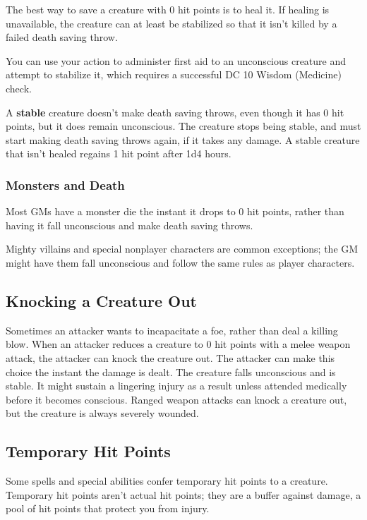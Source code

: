 The best way to save a creature with 0 hit points is to heal it. If healing is unavailable, the creature can at least be stabilized so that it isn't killed by a failed death saving throw.

You can use your action to administer first aid to an unconscious creature and attempt to stabilize it, which requires a successful DC 10 Wisdom (Medicine) check.

A \textbf{stable} creature doesn't make death saving throws, even though it has 0 hit points, but it does remain unconscious. The creature stops being stable, and must start making death saving throws again, if it takes any damage. A stable creature that isn't healed regains 1 hit point after 1d4 hours.

\subsubsection{Monsters and Death}

Most GMs have a monster die the instant it drops to 0 hit points, rather than having it fall unconscious and make death saving throws.

Mighty villains and special nonplayer characters are common exceptions; the GM might have them fall unconscious and follow the same rules as player characters.

\subsection{Knocking a Creature Out}

Sometimes an attacker wants to incapacitate a foe, rather than deal a killing blow. When an attacker reduces a creature to 0 hit points with a melee weapon attack, the attacker can knock the creature out. The attacker can make this choice the instant the damage is dealt. The creature falls unconscious and is stable. It might sustain a lingering injury as a result unless attended medically before it becomes conscious. Ranged weapon attacks can knock a creature out, but the creature is always severely wounded.

\subsection{Temporary Hit Points}

Some spells and special abilities confer temporary hit points to a creature. Temporary hit points aren't actual hit points; they are a buffer against damage, a pool of hit points that protect you from injury.

